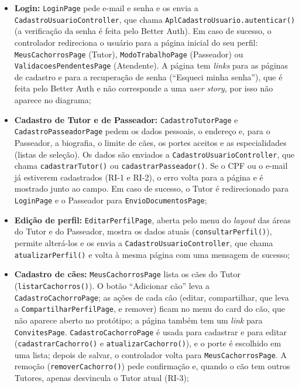 \begin{sloppypar}
\begin{itemize}
	\item \textbf{Login:} \texttt{LoginPage} pede e-mail e senha e os envia a \texttt{CadastroUsuarioController}, que chama \texttt{AplCadastroUsuario.autenticar()} (a verificação da senha é feita pelo Better Auth). Em caso de sucesso, o controlador redireciona o usuário para a página inicial do seu perfil: \texttt{MeusCachorrosPage} (Tutor), \texttt{ModoTrabalhoPage} (Passeador) ou \texttt{ValidacoesPendentesPage} (Atendente). A página tem \textit{links} para as páginas de cadastro e para a recuperação de senha (``Esqueci minha senha''), que é feita pelo Better Auth e não corresponde a uma \textit{user story}, por isso não aparece no diagrama;
	\item \textbf{Cadastro de Tutor e de Passeador:} \texttt{CadastroTutorPage} e \texttt{CadastroPasseadorPage} pedem os dados pessoais, o endereço e, para o Passeador, a biografia, o limite de cães, os portes aceitos e as especialidades (listas de seleção). Os dados são enviados a \texttt{CadastroUsuarioController}, que chama \texttt{cadastrarTutor()} ou \texttt{cadastrarPasseador()}. Se o CPF ou o e-mail já estiverem cadastrados (RI-1 e RI-2), o erro volta para a página e é mostrado junto ao campo. Em caso de sucesso, o Tutor é redirecionado para \texttt{LoginPage} e o Passeador para \texttt{EnvioDocumentosPage};
	\item \textbf{Edição de perfil:} \texttt{EditarPerfilPage}, aberta pelo menu do \textit{layout} das áreas do Tutor e do Passeador, mostra os dados atuais (\texttt{consultarPerfil()}), permite alterá-los e os envia a \texttt{CadastroUsuarioController}, que chama \texttt{atualizarPerfil()} e volta à mesma página com uma mensagem de sucesso;
	\item \textbf{Cadastro de cães:} \texttt{MeusCachorrosPage} lista os cães do Tutor (\texttt{listarCachorros()}). O botão ``Adicionar cão'' leva a \texttt{CadastroCachorroPage}; as ações de cada cão (editar, compartilhar, que leva a \texttt{CompartilharPerfilPage}, e remover) ficam no menu do card do cão, que não aparece aberto no protótipo; a página também tem um \textit{link} para \texttt{ConvitesPage}. \texttt{CadastroCachorroPage} é usada para cadastrar e para editar (\texttt{cadastrarCachorro()} e \texttt{atualizarCachorro()}), e o porte é escolhido em uma lista; depois de salvar, o controlador volta para \texttt{MeusCachorrosPage}. A remoção (\texttt{removerCachorro()}) pede confirmação e, quando o cão tem outros Tutores, apenas desvincula o Tutor atual (RI-3);

\end{itemize}
\end{sloppypar}
